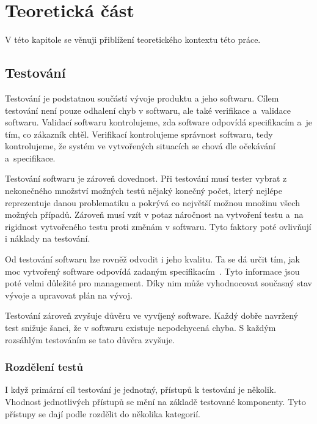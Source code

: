 \chapter{Teoretická část}\label{chap:teorie}

V této kapitole se věnuji přiblížení teoretického kontextu této práce.

\section{Testování}

Testování je podstatnou součástí vývoje produktu a jeho softwaru. Cílem testování není pouze odhalení chyb v softwaru, ale také verifikace a~validace softwaru. Validací softwaru kontrolujeme, zda software odpovídá specifikacím a~je tím, co zákazník chtěl. Verifikací kontrolujeme správnost softwaru, tedy kontrolujeme, že systém ve vytvořených situacích se chová dle očekávání a~specifikace. \cite{singh2012software}

Testování softwaru je zároveň dovednost. Při testování musí tester vybrat z nekonečného množství možných testů nějaký konečný počet, který nejlépe reprezentuje danou problematiku a pokrývá co největší možnou množinu všech možných případů. Zároveň musí vzít v potaz náročnost na vytvoření testu a~na rigidnost vytvořeného testu proti změnám v softwaru. Tyto faktory poté ovlivňují i náklady na testování. \cite{fewster1999software}

Od testování softwaru lze rovněž odvodit i jeho kvalitu. Ta se dá určit tím, jak moc vytvořený software odpovídá zadaným specifikacím~\cite{software_quality}. Tyto informace jsou poté velmi důležité pro management. Díky nim může vyhodnocovat současný stav vývoje a upravovat plán na vývoj. 

Testování zároveň zvyšuje důvěru ve vyvíjený software. Každý dobře navržený test snižuje šanci, že v softwaru existuje nepodchycená chyba. S každým rozsáhlým testováním se tato důvěra zvyšuje. \cite{fewster1999software}

\subsection{Rozdělení testů}

I když primární cíl testování je jednotný, přístupů k testování je několik. Vhodnost jednotlivých přístupů se mění na základě testované komponenty. Tyto přístupy se dají podle \cite{luo2001software} rozdělit do několika kategorií.

